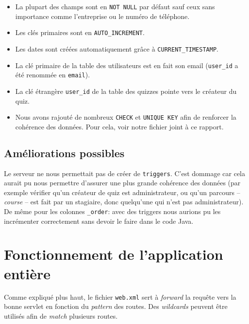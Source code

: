 \sql
\begin{itemize}
    \item La plupart des champs sont en \lstinline{NOT NULL} par défaut sauf ceux sans importance comme l'entreprise ou le numéro de téléphone.
    \item Les clés primaires sont en \lstinline{AUTO_INCREMENT}.
    \item Les dates sont créées automatiquement grâce à \lstinline{CURRENT_TIMESTAMP}.
    \item La clé primaire de la table des utilisateurs est en fait son email (\lstinline{user_id} a été renommée en \lstinline{email}).
    \item La clé étrangère \lstinline{user_id} de la table des quizzes pointe vers le créateur du quiz.
    \item Nous avons rajouté de nombreux \lstinline{CHECK} et \lstinline{UNIQUE KEY} afin de renforcer la cohérence des données. Pour cela, voir notre fichier joint à ce rapport.
\end{itemize}

\subsection{Améliorations possibles}

\fakeshell
Le serveur ne nous permettait pas de créer de \lstinline{triggers}. C'est dommage car cela aurait pu nous permettre d'assurer une plus grande cohérence des données (par exemple vérifier qu'un créateur de quiz est administrateur, ou qu'un parcours -- \textit{course} -- est fait par un stagiaire, donc quelqu'une qui n'est pas administrateur). De même pour les colonnes \lstinline{_order}: avec des triggers nous  aurions pu les incrémenter correctement sans devoir le faire dans le code Java.

\section{Fonctionnement de l'application entière}

Comme expliqué plus haut, le fichier \lstinline{web.xml} sert à \textit{forward} la requête vers la bonne servlet en fonction du \textit{pattern} des routes. Des \textit{wildcards} peuvent être utilisés afin de \textit{match} plusieurs routes.

\medskip

